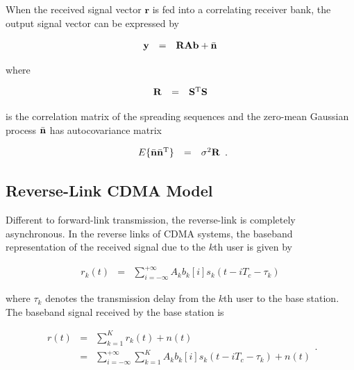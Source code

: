 \documentclass[a4paper,11pt,fleqn]{article}
\newcommand{\br}{{\mathbf r}}
\newcommand{\bA}{{\mathbf A}}
\newcommand{\bb}{{\bf b}}
\newcommand{\bn}{{\bf n}}
\newcommand{\by}{{\bf y}}
\newcommand{\bS}{{\bf S}}
\newcommand{\bR}{{\bf R}}
\begin{document}
When the received signal vector $\br$ is fed into a correlating
receiver bank, the output signal vector can be expressed by

\begin{equation}
\begin{array}{rcl}
\by&=&\bR\bA\bb + \bar{\bn}
\end{array}
\end{equation}

\noindent where

\begin{equation}
\begin{array}{rcl}
\bR&=&\bS^{\rm T}\bS
\end{array}
\end{equation}

\noindent is the correlation matrix of the spreading sequences and
the zero-mean Gaussian process $\bar{\bn}$ has autocovariance
matrix

\begin{equation}
\begin{array}{rcl}
E\{\bar{\bn}\bar{\bn}^{\rm T}\}&=&\sigma^2\bR
\end{array}.
\end{equation}

\subsection{Reverse-Link CDMA Model}
Different to forward-link transmission, the reverse-link is
completely asynchronous. In the reverse links of CDMA systems, the
baseband representation of the received signal due to the $k$th
user is given by

\begin{equation}
\begin{array}{rcl}
r_k(t)&=&\sum\limits_{i=-\infty}^{+\infty}A_k b_k[i]
s_k(t-iT_c-\tau_k)
\end{array}
\end{equation}

\noindent where $\tau_k$ denotes the transmission delay from the
$k$th user to the base station. The baseband signal received by
the base station is

\begin{equation}
\begin{array}{rcl}
r(t)&=&\sum\limits_{k=1}^{K}r_k(t)+n(t)\\
&=&\sum\limits_{i=-\infty}^{+\infty}\sum\limits_{k=1}^{K}A_k
b_k[i] s_k(t-iT_c-\tau_k)+n(t)
\end{array}.
\end{equation}
\end{document}
